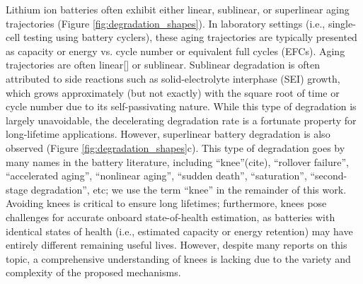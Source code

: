 \documentclass[journal=jpcl, manuscript=article, layout=onecolumn]{achemso}
\begin{document}
Lithium ion batteries often exhibit either linear, sublinear, or superlinear aging trajectories (Figure \ref{fig:degradation_shapes}). In laboratory settings (i.e., single-cell testing using battery cyclers), these aging trajectories are typically presented as capacity or energy vs. cycle number or equivalent full cycles (EFCs). Aging trajectories are often linear[] or sublinear\cite{bloom_accelerated_2001, broussely_aging_2001, wright_calendar-_2002, smith_high_2011, attia_revisiting_2020}. Sublinear degradation is often attributed to side reactions such as solid-electrolyte interphase (SEI) growth, which grows approximately\cite{bloom_accelerated_2001, broussely_aging_2001, wright_calendar-_2002, smith_high_2011} (but not exactly\cite{attia_revisiting_2020}) with the square root of time or cycle number due to its self-passivating nature. While this type of degradation is largely unavoidable, the decelerating degradation rate is a fortunate property for long-lifetime applications. However, superlinear battery degradation is also observed (Figure \ref{fig:degradation_shapes}c). This type of degradation goes by many names in the battery literature, including ``knee''(cite), ``rollover failure''\cite{ma_editors_2019}, ``accelerated aging'', ``nonlinear aging''\cite{schuster_nonlinear_2015, bach_nonlinear_2016, yang_modeling_2017, mandli_analysis_2019, keil_linear_2019, atalay_theory_2020}, ``sudden death''\cite{muller_model-based_2019, willenberg_development_2020}, ``saturation''\cite{lin_comprehensive_2013}, ``second-stage degradation''\cite{dubarry_perspective_2020}, etc; we use the term ``knee'' in the remainder of this work. Avoiding knees is critical to ensure long lifetimes; furthermore, knees pose challenges for accurate onboard state-of-health estimation, as batteries with identical states of health (i.e., estimated capacity or energy retention) may have entirely different remaining useful lives\cite{dubarry_perspective_2020}. However, despite many reports on this topic, a comprehensive understanding of knees is lacking due to the variety and complexity of the proposed mechanisms.
\end{document}
